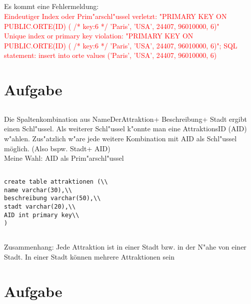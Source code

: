 \documentclass[a4paper,11pt,titlepage]{article}
\begin{document}
\subsection{}
Es kommt eine Fehlermeldung:\\
\textcolor{red}{Eindeutiger Index oder Prim"arschl"ussel verletzt: "PRIMARY KEY ON PUBLIC.ORTE(ID) ( /* key:6 */ 'Paris', 'USA', 24407, 96010000, 6)"\\
Unique index or primary key violation: "PRIMARY KEY ON PUBLIC.ORTE(ID) ( /* key:6 */ 'Paris', 'USA', 24407, 96010000, 6)"; SQL\\					
statement: insert into orte values ('Paris', 'USA', 24407, 96010000, 6)}

\section{Aufgabe}
\subsection{}
Die Spaltenkombination aus NameDerAttraktion+ Beschreibung+ Stadt ergibt einen Schl"ussel. Als weiterer Schl"ussel k"onnte man eine AttraktionsID (AID) w"ahlen. Zus"atzlich w"are jede weitere Kombination mit AID als Schl"ussel möglich. (Also bspw. Stadt+ AID)\\
Meine Wahl: AID als Prim"arschl"ussel
\subsection{}
\begin{verbatim}
create table attraktionen (\\
name varchar(30),\\
beschreibung varchar(50),\\
stadt varchar(20),\\
AID int primary key\\
)

\end{verbatim}
\subsection{}

\subsection{}
Zusammenhang: 	Jede Attraktion ist in einer Stadt bzw. in der N"ahe von einer Stadt. In einer Stadt können mehrere Attraktionen sein
\section{Aufgabe}
\end{document}

